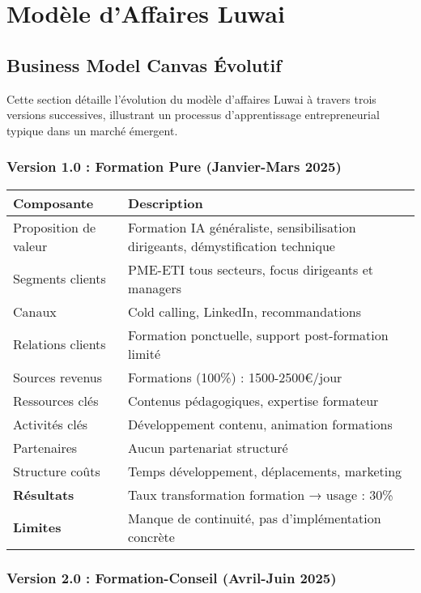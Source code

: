 \chapter{Modèle d'Affaires Luwai}
\label{app:luwai}

\section{Business Model Canvas Évolutif}

Cette section détaille l'évolution du modèle d'affaires Luwai à travers trois versions successives, illustrant un processus d'apprentissage entrepreneurial typique dans un marché émergent.

\subsection{Version 1.0 : Formation Pure (Janvier-Mars 2025)}

\begin{longtable}{@{}p{4cm}p{10cm}@{}}
\toprule
\textbf{Composante} & \textbf{Description} \\
\midrule
Proposition de valeur & Formation IA généraliste, sensibilisation dirigeants, démystification technique \\
Segments clients & PME-ETI tous secteurs, focus dirigeants et managers \\
Canaux & Cold calling, LinkedIn, recommandations \\
Relations clients & Formation ponctuelle, support post-formation limité \\
Sources revenus & Formations (100\%) : 1500-2500€/jour \\
Ressources clés & Contenus pédagogiques, expertise formateur \\
Activités clés & Développement contenu, animation formations \\
Partenaires & Aucun partenariat structuré \\
Structure coûts & Temps développement, déplacements, marketing \\
\midrule
\textbf{Résultats} & Taux transformation formation → usage : 30\% \\
\textbf{Limites} & Manque de continuité, pas d'implémentation concrète \\
\bottomrule
\end{longtable}

\subsection{Version 2.0 : Formation-Conseil (Avril-Juin 2025)}

